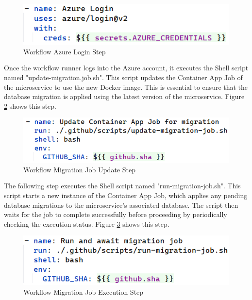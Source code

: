 \documentclass[12pt, reqno]{amsbook}
\theoremstyle{definition}
\theoremstyle{definition}
\numberwithin{section}{chapter}
\numberwithin{table}{chapter}
\numberwithin{figure}{chapter}
\begin{document}
\begin{figure}[H]
  \centering
  \includegraphics[width=0.6\linewidth]{images/GithubWorkflowAzureLogin.png}
  \caption{\label{Figure:GithubWorkflowAzureLogin}Workflow Azure Login Step}
\end{figure}

Once the workflow runner logs into the Azure account, it executes the Shell script named "update-migration.job.sh". This script updates the Container App Job of the microservice to use the new Docker image. This is essential to ensure that the database migration is applied using the latest version of the microservice. Figure \ref{Figure:GithubWorkflowMigrationJobUpdate} shows this step.

\begin{figure}[H]
  \centering
  \includegraphics[width=0.6\linewidth]{images/GithubWorkflowMigrationJobUpdate.png}
  \caption{\label{Figure:GithubWorkflowMigrationJobUpdate}Workflow Migration Job Update Step}
\end{figure}

The following step executes the Shell script named "run-migration-job.sh". This script starts a new instance of the Container App Job, which applies any pending database migrations to the microservice's associated database. The script then waits for the job to complete successfully before proceeding by periodically checking the execution status. Figure \ref{Figure:GithubWorkflowMigrationJobExecution} shows this step.

\begin{figure}[H]
  \centering
  \includegraphics[width=0.6\linewidth]{images/GithubWorkflowMigrationJobExecution.png}
  \caption{\label{Figure:GithubWorkflowMigrationJobExecution}Workflow Migration Job Execution Step}
\end{figure}
\end{document}
